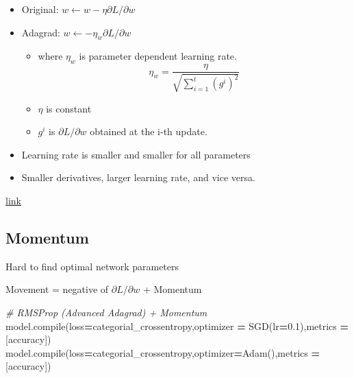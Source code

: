 \documentclass[
]{book}
\newenvironment{Shaded}{\begin{snugshade}}{\end{snugshade}}
\newcommand{\BuiltInTok}[1]{#1}
\newcommand{\CommentTok}[1]{\textcolor[rgb]{0.56,0.35,0.01}{\textit{#1}}}
\newcommand{\FloatTok}[1]{\textcolor[rgb]{0.00,0.00,0.81}{#1}}
\newcommand{\NormalTok}[1]{#1}
\newcommand{\OperatorTok}[1]{\textcolor[rgb]{0.81,0.36,0.00}{\textbf{#1}}}
\newcommand{\StringTok}[1]{\textcolor[rgb]{0.31,0.60,0.02}{#1}}
\providecommand{\tightlist}{%
  \setlength{\itemsep}{0pt}\setlength{\parskip}{0pt}}
\begin{document}
\begin{itemize}
\item
  Original: \(w \leftarrow w - \eta \partial L /\partial w\)
\item
  Adagrad: \(w \leftarrow - \eta_{w} \partial L / \partial w\)

  \begin{itemize}
  \tightlist
  \item
    where \(\eta_w\) is parameter dependent learning rate.\\
    \[
    \eta_w = \frac{\eta}{\sqrt{\sum_{i=1}^{t}(g^i)^2}}
    \]
  \item
    \(\eta\) is constant
  \item
    \(g^i\) is \(\partial L / \partial w\) obtained at the i-th update.
  \end{itemize}
\item
  Learning rate is smaller and smaller for all parameters
\item
  Smaller derivatives, larger learning rate, and vice versa.
\end{itemize}

\href{https://courses.cs.washington.edu/courses/cse547/15sp/slides/adagrad.pdf}{link}

\hypertarget{momentum}{%
\subsection{Momentum}\label{momentum}}

Hard to find optimal network parameters

Movement = negative of \(\partial L/ \partial w\) + Momentum

\begin{Shaded}
\begin{Highlighting}[]
\CommentTok{\# RMSProp (Advanced Adagrad) + Momentum}
\NormalTok{model.}\BuiltInTok{compile}\NormalTok{(loss}\OperatorTok{=}\StringTok{\textquotesingle{}categorial\_crossentropy\textquotesingle{}}\NormalTok{,optimizer }\OperatorTok{=}\NormalTok{ SGD(lr}\OperatorTok{=}\FloatTok{0.1}\NormalTok{),metrics }\OperatorTok{=}\NormalTok{ [}\StringTok{\textquotesingle{}accuracy\textquotesingle{}}\NormalTok{])}
\NormalTok{model.}\BuiltInTok{compile}\NormalTok{(loss}\OperatorTok{=}\StringTok{\textquotesingle{}categorial\_crossentropy\textquotesingle{}}\NormalTok{,optimizer}\OperatorTok{=}\NormalTok{Adam(),metrics }\OperatorTok{=}\NormalTok{ [}\StringTok{\textquotesingle{}accuracy\textquotesingle{}}\NormalTok{])}
\end{Highlighting}
\end{Shaded}
\end{document}
